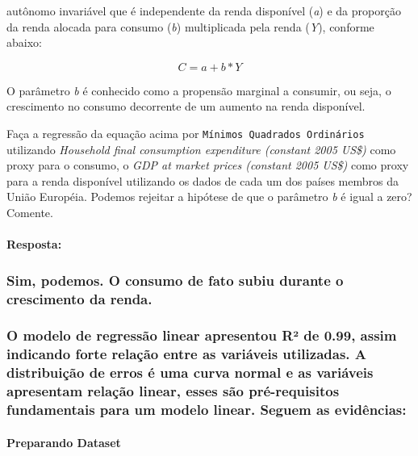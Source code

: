 \documentclass[11pt]{article}
\begin{document}
autônomo invariável que é independente da renda disponível (\emph{a}) e
da proporção da renda alocada para consumo (\emph{b}) multiplicada pela
renda (\emph{Y}), conforme abaixo:

\[C = a + b * Y\]

O parâmetro \emph{b} é conhecido como a propensão marginal a consumir,
ou seja, o crescimento no consumo decorrente de um aumento na renda
disponível.

Faça a regressão da equação acima por
\texttt{Mínimos\ Quadrados\ Ordinários} utilizando \emph{Household final
consumption expenditure (constant 2005 US\$)} como proxy para o consumo,
o \emph{GDP at market prices (constant 2005 US\$)} como proxy para a
renda disponível utilizando os dados de cada um dos países membros da
União Européia. Podemos rejeitar a hipótese de que o parâmetro \emph{b}
é igual a zero? Comente.

    \paragraph{Resposta:}\label{resposta}

    \subsubsection{Sim, podemos. O consumo de fato subiu durante o
crescimento da
renda.}\label{sim-podemos.-o-consumo-de-fato-subiu-durante-o-crescimento-da-renda.}

\subsubsection{O modelo de regressão linear apresentou R² de 0.99, assim
indicando forte relação entre as variáveis utilizadas. A distribuição de
erros é uma curva normal e as variáveis apresentam relação linear, esses
são pré-requisitos fundamentais para um modelo linear. Seguem as
evidências:}\label{o-modelo-de-regressuxe3o-linear-apresentou-r-de-0.99-assim-indicando-forte-relauxe7uxe3o-entre-as-variuxe1veis-utilizadas.-a-distribuiuxe7uxe3o-de-erros-uxe9-uma-curva-normal-e-as-variuxe1veis-apresentam-relauxe7uxe3o-linear-esses-suxe3o-pruxe9-requisitos-fundamentais-para-um-modelo-linear.-seguem-as-eviduxeancias}

    \paragraph{Preparando Dataset}\label{preparando-dataset}
\end{document}
